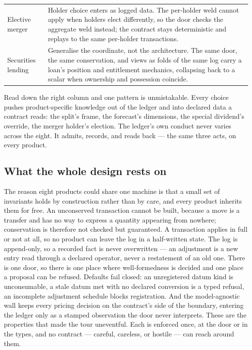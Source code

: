 \begin{center}
\begin{tabular}{@{}p{3.5cm}p{10.5cm}@{}}
Elective merger
& Holder choice enters as logged data. The per-holder weld cannot apply when holders
elect differently, so the door checks the aggregate weld instead; the contract stays
deterministic and replays to the same per-holder transactions. \\

Securities lending
& Generalise the coordinate, not the architecture. The same door, the same
conservation, and views as folds of the same log carry a loan's position and
entitlement mechanics, collapsing back to a scalar when ownership and possession
coincide. \\
\bottomrule
\end{tabular}
\end{center}

Read down the right column and one pattern is unmistakable. Every choice pushes
product-specific knowledge out of the ledger and into declared data a contract reads:
the split's frame, the forecast's dimensions, the special dividend's override, the
merger holder's election. The ledger's own conduct never varies across the eight. It
admits, records, and reads back --- the same three acts, on every product.

\subsection{What the whole design rests on}

The reason eight products could share one machine is that a small set of invariants
holds by construction rather than by care, and every product inherits them for free.
An unconserved transaction cannot be built, because a move is a transfer and has no
way to express a quantity appearing from nowhere; conservation is therefore not
checked but guaranteed. A transaction applies in full or not at all, so no product
can leave the log in a half-written state. The log is append-only, so a recorded fact
is never overwritten --- an adjustment is a new entry read through a declared operator,
never a restatement of an old one. There is one door, so there is one place where
well-formedness is decided and one place a proposal can be refused. Defaults fail
closed: an unregistered datum kind is unconsumable, a stale datum met with no declared
conversion is a typed refusal, an incomplete adjustment schedule blocks registration.
And the model-agnostic wall keeps every pricing decision on the contract's side of the
boundary, entering the ledger only as a stamped observation the door never interprets.
These are the properties that made the tour uneventful. Each is enforced once, at the
door or in the types, and no contract --- careful, careless, or hostile --- can reach
around them.

